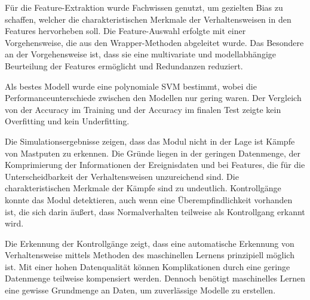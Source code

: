 Für die Feature-Extraktion wurde Fachwissen genutzt, um gezielten Bias zu schaffen, welcher die charakteristischen Merkmale der Verhaltensweisen in den Features hervorheben soll. Die Feature-Auswahl erfolgte mit einer Vorgehensweise, die aus den Wrapper-Methoden abgeleitet wurde. Das Besondere an der Vorgehensweise ist, dass sie eine multivariate und modellabhängige Beurteilung der Features ermöglicht und Redundanzen reduziert. \par

Als bestes Modell wurde eine polynomiale SVM bestimmt, wobei die Performanceunterschiede zwischen den Modellen nur gering waren. Der Vergleich von der Accuracy im Training und der Accuracy im finalen Test zeigte kein Overfitting und kein Underfitting.\par

Die Simulationsergebnisse zeigen, dass das Modul nicht in der Lage ist Kämpfe von Mastputen zu erkennen. Die Gründe liegen in der geringen Datenmenge, der Komprimierung der Informationen der Ereignisdaten und bei Features, die für die Unterscheidbarkeit der Verhaltensweisen unzureichend sind. Die charakteristischen Merkmale der Kämpfe sind zu undeutlich. Kontrollgänge konnte das Modul detektieren, auch wenn eine Überempfindlichkeit vorhanden ist, die sich darin äußert, dass Normalverhalten teilweise als Kontrollgang erkannt wird. \par

Die Erkennung der Kontrollgänge zeigt, dass eine automatische Erkennung von Verhaltensweise mittels Methoden des maschinellen Lernens prinzipiell möglich ist. Mit einer hohen Datenqualität können Komplikationen durch eine geringe Datenmenge teilweise kompensiert werden. Dennoch benötigt maschinelles Lernen eine gewisse Grundmenge an Daten, um zuverlässige Modelle zu erstellen. 

